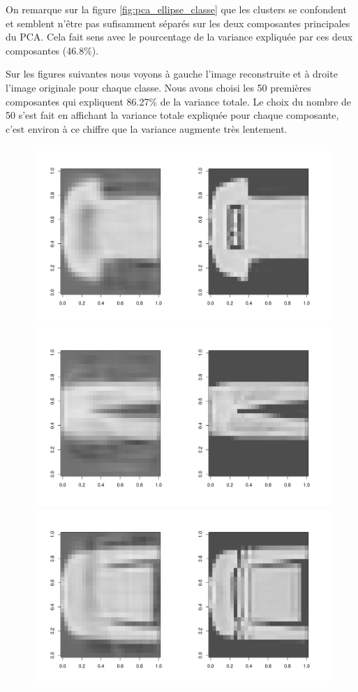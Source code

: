 \documentclass{article}
\begin{document}
On remarque sur la figure \ref{fig:pca_ellipse_classe} que les clusters se confondent et semblent n'être pas sufisamment séparés sur les deux composantes principales du PCA. Cela fait sens avec le pourcentage de la variance expliquée par ces deux composantes (46.8\%).

Sur les figures suivantes nous voyons à gauche l'image reconstruite et à droite l'image originale pour chaque classe. Nous avons choisi les 50 premières composantes qui expliquent 86.27\% de la variance totale. Le choix du nombre de 50 s'est fait en affichant la variance totale expliquée pour chaque composante, c'est environ à ce chiffre que la variance augmente très lentement.

\begin{figure}[H] 
\centering
\includegraphics[width=\textwidth, trim=0 0 0 5cm]{pca_reconst_0.png}
\includegraphics[width=\textwidth]{pca_reconst_1.png}
\includegraphics[width=\textwidth]{pca_reconst_2.png}
\label{fig:pca_ellipse}
\end{figure}
\end{document}

